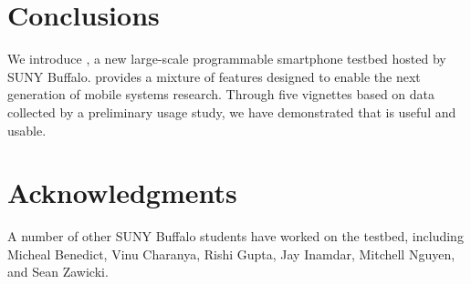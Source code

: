 \section{Conclusions}
\label{sec-conclusions}

We introduce \PhoneLab{}, a new large-scale programmable smartphone testbed
hosted by SUNY Buffalo. \PhoneLab{} provides a mixture of features designed
to enable the next generation of mobile systems research. Through five
vignettes based on data collected by a preliminary usage study, we have
demonstrated that \PhoneLab{} is useful and usable.

\section*{Acknowledgments}

A number of other SUNY Buffalo students have worked on the \PhoneLab{}
testbed, including Micheal Benedict, Vinu Charanya, Rishi Gupta, Jay Inamdar,
Mitchell Nguyen, and Sean Zawicki.
